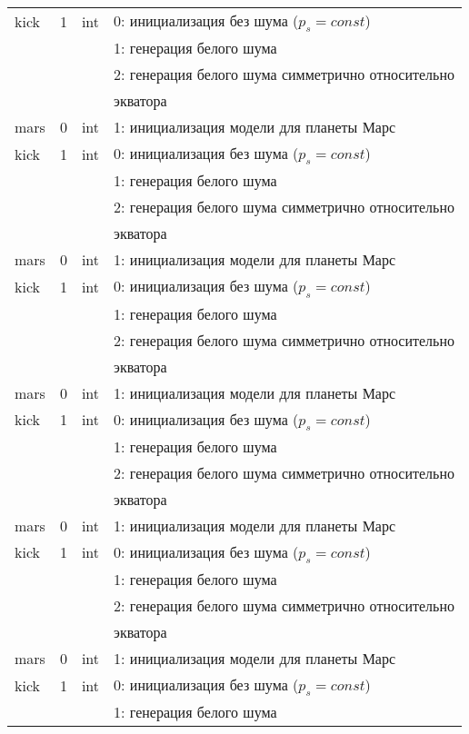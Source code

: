 \documentclass[14pt]{extreport}
\begin{document}
\begin{longtable}[c]{|l|c|l|l|}
kick & 1 & int & 0: инициализация без шума ($p_s = const$) \\
      &   &     & 1: генерация белого шума                  \\
      &   &     & 2: генерация белого шума симметрично относительно \\
  & & & экватора    \\
 mars & 0 & int & 1: инициализация модели для планеты Марс     \\
kick & 1 & int & 0: инициализация без шума ($p_s = const$) \\
      &   &     & 1: генерация белого шума                  \\
      &   &     & 2: генерация белого шума симметрично относительно \\
  & & & экватора    \\
 mars & 0 & int & 1: инициализация модели для планеты Марс     \\
kick & 1 & int & 0: инициализация без шума ($p_s = const$) \\
      &   &     & 1: генерация белого шума                  \\
      &   &     & 2: генерация белого шума симметрично относительно \\
  & & & экватора    \\
 mars & 0 & int & 1: инициализация модели для планеты Марс     \\
kick & 1 & int & 0: инициализация без шума ($p_s = const$) \\
      &   &     & 1: генерация белого шума                  \\
      &   &     & 2: генерация белого шума симметрично относительно \\
  & & & экватора    \\
 mars & 0 & int & 1: инициализация модели для планеты Марс     \\
kick & 1 & int & 0: инициализация без шума ($p_s = const$) \\
      &   &     & 1: генерация белого шума                  \\
      &   &     & 2: генерация белого шума симметрично относительно \\
  & & & экватора    \\
 mars & 0 & int & 1: инициализация модели для планеты Марс     \\
kick & 1 & int & 0: инициализация без шума ($p_s = const$) \\
      &   &     & 1: генерация белого шума                  \\

\end{longtable}
\end{document}
